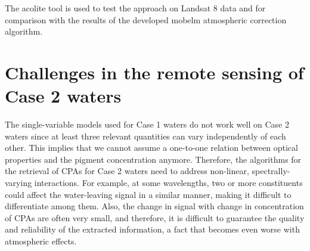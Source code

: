 The \gls{acolite} tool is used to test the \citet{Gordon:1994} approach on Landsat 8 data and for comparison with the results of the developed \gls{mobelm} atmospheric correction algorithm.

\section{Challenges in the remote sensing of Case 2 waters}
The single-variable models used for Case 1 waters do not work well on Case 2 waters since at least three relevant quantities can vary independently of each other. This implies that we cannot assume a one-to-one relation between optical properties and the pigment concentration \citep{IOCCG2000_Coastal} anymore. Therefore, the algorithms for the retrieval of CPAs for Case 2 waters need to address non-linear, spectrally-varying interactions. For example, at some wavelengths, two or more constituents could affect the water-leaving signal in a similar manner, making it difficult to differentiate among them. Also, the change in signal with change in concentration of CPAs are often very small, and therefore, it is difficult to guarantee the quality and reliability of the extracted information, a fact that becomes even worse with atmospheric effects.

